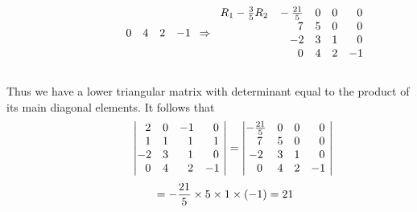 \documentclass[12pt]{amsart}
\begin{document}
\begin{enumerate}
\begin{enumerate}
\begin{align}
\begin{array}{cccc}
					\hspace{2cm} \text{ } \text{ }0 &4 &2 &-1
				\end{array} \Rightarrow
				\begin{array}{cccc}
					R_1-\frac{3}{5}R_2 \hspace{0.3cm} -\frac{21}{5}&0 &0 &\text{ } \text{ }0 \\
					\hspace{2.2cm} \text{ } \text{ }7 &5 &0 &\text{ } \text{ }0 \\
					\hspace{2.2cm} -2 &3 &1 &\text{ } \text{ }0 \\
					\hspace{2.2cm} \text{ } \text{ }0 &4 &2 &-1
				\end{array} \notag
			\end{align} \\
			Thus we have a lower triangular matrix with determinant equal to the product of its main 					diagonal elements. It follows that \\
			\begin{align}
				\hspace{1.5cm}
				\begin{vmatrix}
					\text{ } \text{ }2 &0 &-1 &\text{ } \text{ }0 \text{ } \\
					\text{ } \text{ }1 &1 &\text{ } \text{ }1 &\text{ } \text{ }1 \text{ }  \\
					-2 &3 &\text{ } \text{ }1 &\text{ } \text{ }0 \text{ } \\
					\text{ } \text{ }0 &4 &\text{ } \text{ }2 &-1 \text{ } 
				\end{vmatrix} = 
				\begin{vmatrix}
					-\frac{21}{5}&0 &0 &\text{ } \text{ }0 \text{ } \\
					\text{ } \text{ }7 &5 &0 &\text{ } \text{ }0 \text{ } \\
					-2 &3 &1 &\text{ } \text{ }0 \text{ } \\
					\text{ } \text{ }0 &4 &2 &-1 \text{ } 
				\end{vmatrix} \notag
			\end{align}
			\begin{align}
				\hspace{1cm}=-\frac{21}{5}\times5\times1\times(-1)=21 \notag
			\end{align}
			

\end{enumerate}
\end{enumerate}
\end{document}
